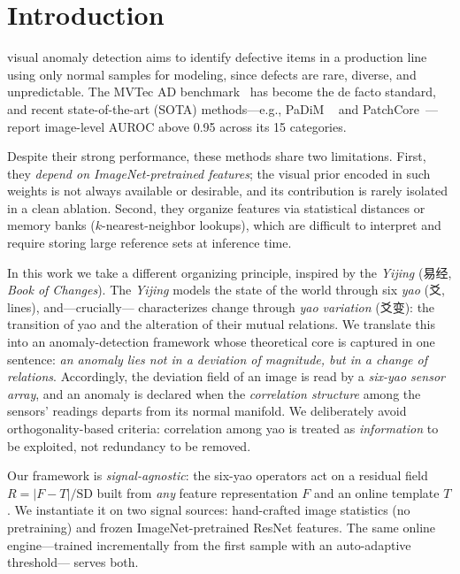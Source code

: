 \documentclass[journal,10pt]{IEEEtran}
\begin{document}
\section{Introduction}
 visual anomaly detection aims to identify
defective items in a production line using only normal samples for
modeling, since defects are rare, diverse, and unpredictable. The
MVTec AD benchmark~\cite{bergmann2019mvtec} has become the de facto
standard, and recent state-of-the-art (SOTA) methods---e.g., PaDiM
~\cite{defard2021padim} and PatchCore~\cite{roth2022patchcore}---report
image-level AUROC above 0.95 across its 15 categories.

Despite their strong performance, these methods share two limitations.
First, they \emph{depend on ImageNet-pretrained features}; the visual
prior encoded in such weights is not always available or desirable, and
its contribution is rarely isolated in a clean ablation. Second, they
organize features via statistical distances or memory banks
($k$-nearest-neighbor lookups), which are difficult to interpret and
require storing large reference sets at inference time.

In this work we take a different organizing principle, inspired by the
\emph{Yijing} (易经, \emph{Book of Changes}). The \emph{Yijing} models the
state of the world through six \emph{yao} (爻, lines), and---crucially---
characterizes change through \emph{yao variation} (爻变): the transition
of yao and the alteration of their mutual relations. We translate this
into an anomaly-detection framework whose theoretical core is captured in
one sentence: \emph{an anomaly lies not in a deviation of magnitude, but
in a change of relations}. Accordingly, the deviation field of an image is
read by a \emph{six-yao sensor array}, and an anomaly is declared when the
\emph{correlation structure} among the sensors' readings departs from its
normal manifold. We deliberately avoid orthogonality-based criteria:
correlation among yao is treated as \emph{information} to be exploited,
not redundancy to be removed.

Our framework is \emph{signal-agnostic}: the six-yao operators act on a
residual field $R = |F - T| / \mathrm{SD}$ built from \emph{any} feature
representation $F$ and an online template $T$. We instantiate it on two
signal sources: hand-crafted image statistics (no pretraining) and frozen
ImageNet-pretrained ResNet features. The same online engine---trained
incrementally from the first sample with an auto-adaptive threshold---
serves both.
\end{document}
